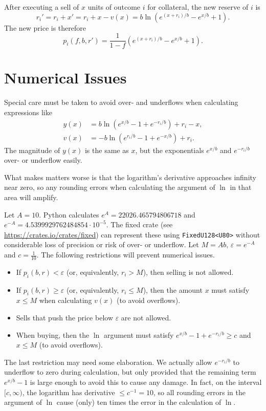 \documentclass[12pt]{article}
\begin{document}
After executing a sell of $x$ units of outcome $i$ for collateral, the new reserve of $i$ is
\[
    r_i' = r_i + x' = r_i + x - v(x) = b \ln (e^{(x + r_i)/b} - e^{x/b} + 1).
\]
The new price is therefore
\[
    p_i(f, b, r') = \frac{1}{1-f} (e^{(x + r_i)/b} - e^{x/b} + 1).
\]

\section{Numerical Issues}

Special care must be taken to avoid over- and underflows when calculating expressions like
\begin{align*}
    y(x) &= b \ln (e^{x/b} - 1 + e^{-r_i/b}) + r_i - x, \\
    v(x) &= -b \ln (e^{r_i/b} - 1 + e^{-x/b}) + r_i.
\end{align*}
The magnitude of $y(x)$ is the same as $x$, but the exponentials $e^{x/b}$ and $e^{-r_i/b}$ over- or underflow easily.

What makes matters worse is that the logarithm's derivative approaches infinity near zero, so any rounding errors when calculating the argument of $\ln$ in that area will amplify.

Let $A = 10$. Python calculates $e^A = 22026.465794806718$ and $e^{-A} = 4.5399929762484854 \cdot 10^{-5}$. The fixed crate (see \url{https://crates.io/crates/fixed}) can represent these using \texttt{FixedU128<U80>} without considerable loss of precision or risk of over- or underflow. Let $M = Ab$, $\varepsilon = e^{-A}$ and $c = \frac{1}{10}$. The following restrictions will prevent numerical issues.

\begin{itemize}
    \item If $p_i(b, r) < \varepsilon$ (or, equivalently, $r_i > M$), then selling is not allowed.
    \item If $p_i(b, r) \geq \varepsilon$ (or, equivalently, $r_i \leq M$), then the amount $x$ must satisfy $x \leq M$ when calculating $v(x)$ (to avoid overflows).
    \item Sells that push the price below $\varepsilon$ are not allowed.
    \item When buying, then the $\ln$ argument must satisfy $e^{x/b} - 1 + e^{-r_i/b} \geq c$ and $x \leq M$ (to avoid overflows).
\end{itemize}

The last restriction may need some elaboration. We actually allow $e^{-r_i/b}$ to underflow to zero during calculation, but only provided that the remaining term $e^{x/b} - 1$ is large enough to avoid this to cause any damage. In fact, on the interval $[c, \infty)$, the logarithm has derivative $\leq c^{-1} = 10$, so all rounding errors in the argument of $\ln$ cause (only) ten times the error in the calculation of $\ln$.
\end{document}
